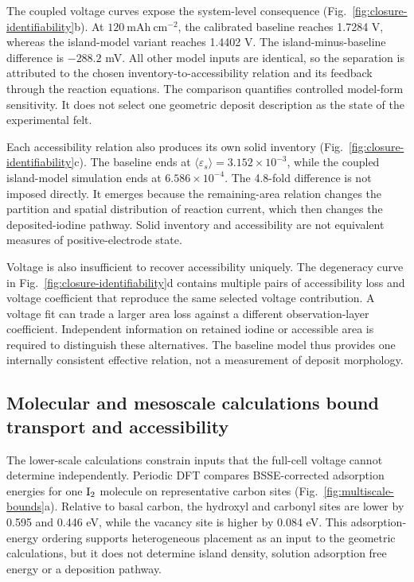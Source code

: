 \documentclass[11pt]{article}
\begin{document}
The coupled voltage curves expose the system-level consequence (Fig.~\ref{fig:closure-identifiability}b). At $120~\mathrm{mAh~cm^{-2}}$, the calibrated baseline reaches 1.7284 V, whereas the island-model variant reaches 1.4402 V. The island-minus-baseline difference is $-288.2$ mV. All other model inputs are identical, so the separation is attributed to the chosen inventory-to-accessibility relation and its feedback through the reaction equations. The comparison quantifies controlled model-form sensitivity. It does not select one geometric deposit description as the state of the experimental felt.

Each accessibility relation also produces its own solid inventory (Fig.~\ref{fig:closure-identifiability}c). The baseline ends at $\langle\varepsilon_s\rangle=3.152\times10^{-3}$, while the coupled island-model simulation ends at $6.586\times10^{-4}$. The 4.8-fold difference is not imposed directly. It emerges because the remaining-area relation changes the partition and spatial distribution of reaction current, which then changes the deposited-iodine pathway. Solid inventory and accessibility are not equivalent measures of positive-electrode state.

Voltage is also insufficient to recover accessibility uniquely. The degeneracy curve in Fig.~\ref{fig:closure-identifiability}d contains multiple pairs of accessibility loss and voltage coefficient that reproduce the same selected voltage contribution. A voltage fit can trade a larger area loss against a different observation-layer coefficient. Independent information on retained iodine or accessible area is required to distinguish these alternatives. The baseline model thus provides one internally consistent effective relation, not a measurement of deposit morphology.

\subsection{Molecular and mesoscale calculations bound transport and accessibility}


The lower-scale calculations constrain inputs that the full-cell voltage cannot determine independently. Periodic DFT compares BSSE-corrected adsorption energies for one $\ce{I2}$ molecule on representative carbon sites (Fig.~\ref{fig:multiscale-bounds}a). Relative to basal carbon, the hydroxyl and carbonyl sites are lower by 0.595 and 0.446 eV, while the vacancy site is higher by 0.084 eV. This adsorption-energy ordering supports heterogeneous placement as an input to the geometric calculations, but it does not determine island density, solution adsorption free energy or a deposition pathway.
\end{document}

